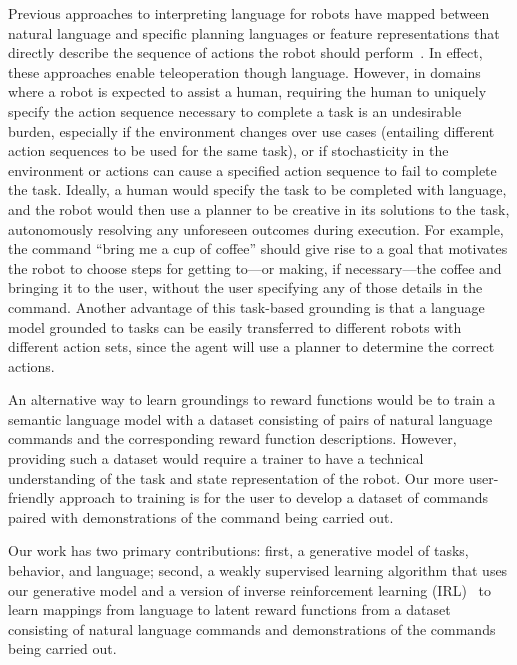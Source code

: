 \documentclass[conference]{IEEEtran}
\begin{document}
Previous approaches to interpreting language for
robots have mapped between natural language and specific planning
languages or feature representations that directly describe the
sequence of actions the robot should perform~\citep{kollar10,
  tellex11, matuszek12, matuszek12a, chen11}. In effect,
these approaches enable teleoperation though language.  
However, in domains where a robot is expected to assist
a human, requiring the human to uniquely specify the action
sequence necessary to complete a task is an undesirable burden, especially
if the environment changes over use cases (entailing different
action sequences to be used for the same task), or if stochasticity in the
environment or actions can cause a specified action sequence to fail to complete
the task. Ideally, a human would specify the task to be completed with language, and the robot would then use a planner to be creative
in its solutions to the task, autonomously resolving any unforeseen
outcomes during execution. For example, the command ``bring me a cup
of coffee'' should give rise to a goal that motivates the robot to
choose steps for getting to---or making, if necessary---the coffee and 
bringing it to the user, without
the user specifying any of those details in the command. Another advantage
of this task-based grounding is that a language model grounded to tasks
can be easily transferred to different robots with different action sets,
since the agent will use a planner to determine the correct actions.


An alternative way to learn groundings to reward functions would be to train a semantic
language model with a dataset consisting of pairs of natural language commands
and the corresponding reward function descriptions. However,
providing such a dataset would require a trainer to have a technical understanding
of the task and state representation of the robot. Our more user-friendly approach
to training is for the user to develop a dataset of commands paired with
demonstrations of the command being carried out. 

Our work has two primary contributions: first, a generative model of tasks, behavior, 
and language; second, a weakly supervised learning algorithm that uses
our generative model and a version of inverse reinforcement learning (IRL)~\cite{ng00}
to learn mappings from language to latent reward functions 
from a dataset consisting of natural language commands and demonstrations
of the commands being carried out.
\end{document}
